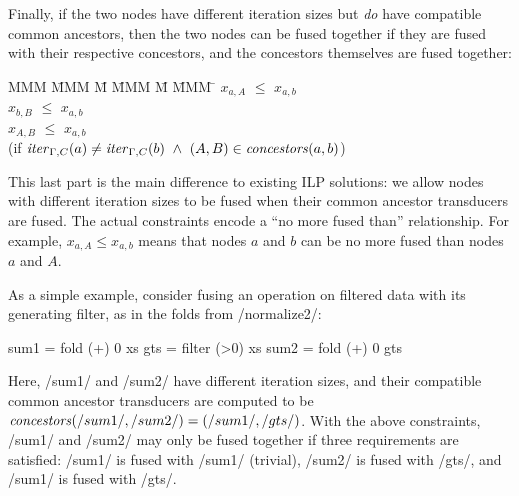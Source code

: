 Finally, if the two nodes have different iteration sizes but \emph{do} have compatible common ancestors, then the two nodes can be fused together if they are fused with their respective concestors, and the concestors themselves are fused together:
\begin{tabbing}
MMM     \= MMM \= M \= MMM \= M \= MMM \= \kill
        \> $x_{a,A}$   \> $\le$ \> $x_{a,b}$    \>       \>     \\
        \> $x_{b,B}$   \> $\le$ \> $x_{a,b}$    \>       \>     \\
        \> $x_{A,B}$   \> $\le$ \> $x_{a,b}$    \>       \>     \\
        \> (if $\mathit{iter}_{\Gamma,C}(a) \not= \mathit{iter}_{\Gamma,C}(b) 
                ~\wedge~ (A,B) \in \mathit{concestors}(a,b)$)
\end{tabbing}

This last part is the main difference to existing ILP solutions: we allow nodes with different iteration sizes to be fused when their common ancestor transducers are fused.
The actual constraints encode a ``no more fused than'' relationship.
For example, $x_{a,A} \le x_{a,b}$ means that nodes $a$ and $b$ can be no more fused than nodes $a$ and $A$. 

As a simple example, consider fusing an operation on filtered data with its generating filter, as in the folds from \Hs/normalize2/:
\begin{haskell}
    sum1 = fold (+) 0  xs
    gts  = filter (>0) xs
    sum2 = fold (+) 0  gts
\end{haskell}

Here, \Hs/sum1/ and \Hs/sum2/ have different iteration sizes, and their compatible common ancestor transducers are computed to be $\concestors(\Hs/sum1/, \Hs/sum2/) = (\Hs/sum1/, \Hs/gts/)$.
With the above constraints, \Hs/sum1/ and \Hs/sum2/ may only be fused together if three requirements are satisfied: \Hs/sum1/ is fused with \Hs/sum1/ (trivial), \Hs/sum2/ is fused with \Hs/gts/, and \Hs/sum1/ is fused with \Hs/gts/.




